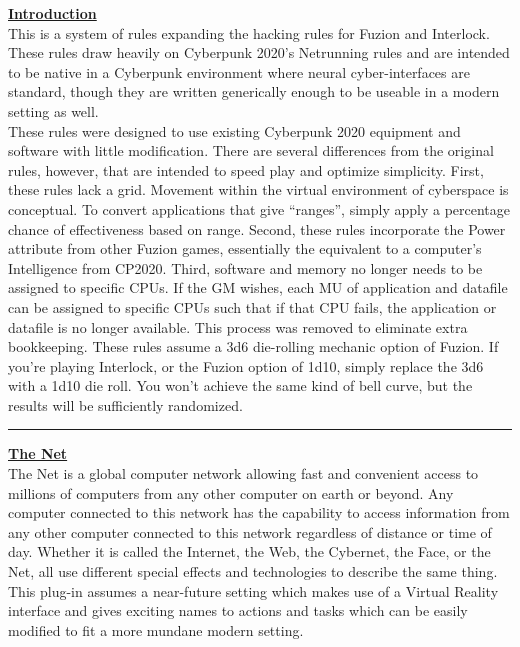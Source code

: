 \documentclass[11pt,twoside,a4paper]{article}
\begin{document}
\begin{multicols*}{2}

\textbf{\underline{\large Introduction}}~\\

This is a system of rules expanding the hacking rules for Fuzion and Interlock. These rules draw heavily on Cyberpunk 2020's Netrunning rules and are intended to be native in a Cyberpunk environment where neural cyber-interfaces are standard, though they are written generically enough to be useable in a modern setting as well. ~\\

These rules were designed to use existing Cyberpunk 2020 equipment and software with little modification. There are several differences from the original rules, however, that are intended to speed play and optimize simplicity. First, these rules lack a grid. Movement within the virtual environment of cyberspace is conceptual. To convert applications that give ``ranges'', simply apply a percentage chance of effectiveness based on range. Second, these rules incorporate the Power attribute from other Fuzion games, essentially the equivalent to a computer's Intelligence from CP2020. Third, software and memory no longer needs to be assigned to specific CPUs. If the GM wishes, each MU of application and datafile can be assigned to specific CPUs such that if that CPU fails, the application or datafile is no longer available. This process was removed to eliminate extra bookkeeping. These rules assume a 3d6 die-rolling mechanic option of Fuzion. If you're playing Interlock, or the Fuzion option of 1d10, simply replace the 3d6 with a 1d10 die roll. You won't achieve the same kind of bell curve, but the results will be sufficiently randomized. %

\begin{center} \rule{0.45\textwidth}{0.01cm} \end{center}

\textbf{\underline{\large The Net}}~\\

The Net is a global computer network allowing fast and convenient access to millions of computers from any other computer on earth or beyond. Any computer connected to this network has the capability to access information from any other computer connected to this network regardless of distance or time of day. Whether it is called the Internet, the Web, the Cybernet, the Face, or the Net, all use different special effects and technologies to describe the same thing. This plug-in assumes a near-future setting which makes use of a Virtual Reality interface and gives exciting names to actions and tasks which can be easily modified to fit a more mundane modern setting. ~\\


\end{multicols*}
\end{document}
